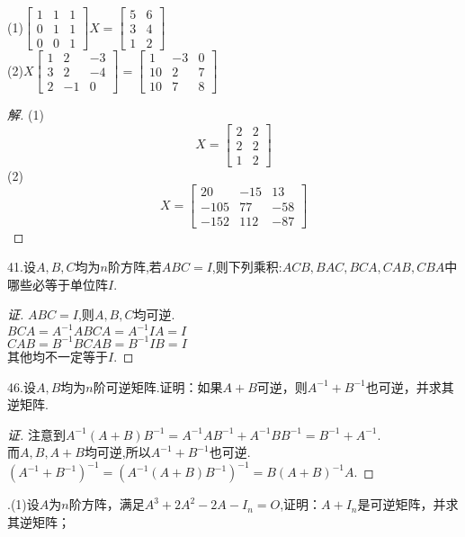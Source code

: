 \documentclass[10pt,a4paper]{report}
\begin{document}
(1)$\left[
\begin{matrix}
1 & 1 & 1\\
0 & 1 & 1\\
0 & 0 & 1
\end{matrix}
\right]X= \left[
\begin{matrix}
5 & 6\\
3 & 4\\
1 & 2
\end{matrix}
\right]$\\
(2)$X\left[
\begin{matrix}
1 & 2 & -3\\
3 & 2 & -4\\
2 & -1 & 0
\end{matrix}
\right]= \left[
\begin{matrix}
1 & -3 & 0\\
10 & 2 & 7\\
10 & 7 & 8
\end{matrix}
\right]$
\begin{proof}[解]
	(1)
	$$X = \left[
	\begin{matrix}
	2 & 2\\
	2 & 2\\
	1 & 2
	\end{matrix}
	\right]$$
	(2)
	$$
	X = \left[
	\begin{matrix}
	20 & -15 & 13\\
	-105 & 77 & -58\\
	-152 & 112 & -87
	\end{matrix}
	\right]
	$$
\end{proof}
\noindent 41.设$A,B,C$均为$n$阶方阵,若$ABC=I$,则下列乘积:$ACB,BAC,BCA,CAB,CBA$中哪些必等于单位阵$I$.
\begin{proof}[证]
	$ABC = I$,则$A, B, C$均可逆.\\
	$BCA = A^{-1}ABCA = A^{-1}IA = I$\\
	$CAB = B^{-1}BCAB = B^{-1}IB = I$\\
	其他均不一定等于$I$.
\end{proof}
\noindent 46.设$A,B$均为$n$阶可逆矩阵.证明：如果$A+B$可逆，则$A^{-1}+B^{-1}$也可逆，并求其逆矩阵.
\begin{proof}[证]
	注意到$A^{-1}(A+B)B^{-1} = A^{-1}AB^{-1}+A^{-1}BB^{-1} = B^{-1}+A^{-1}.$\\
	而$A, B, A+B$均可逆,所以$A^{-1}+B^{-1}$也可逆.\\
	$(A^{-1}+B^{-1})^{-1} = (A^{-1}(A+B)B^{-1})^{-1} = B(A+B)^{-1}A.$
\end{proof}
.(1)设$A$为$n$阶方阵，满足$A^{3}+2A^{2}-2A-I_{n}=O$,证明：$A+I_{n}$是可逆矩阵，并求其逆矩阵；\\
\end{document}
